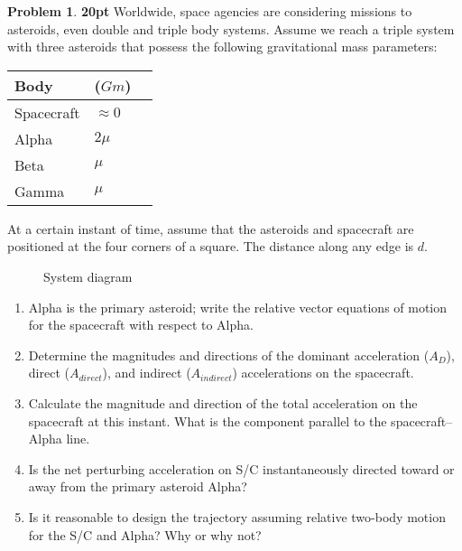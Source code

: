 \documentclass[10pt]{article}
\theoremstyle{definition}
\newtheorem{prob}{Problem}[section]
\newenvironment{subprob}%
{\renewcommand{\theenumi}{\alph{enumi}}\renewcommand{\labelenumi}{(\theenumi)}\begin{enumerate}}%
{\end{enumerate}}%
\begin{document}
\clearpage\newpage
\begin{prob}
    \textbf{20pt} Worldwide, space agencies are considering missions to asteroids, even double and triple body systems. 
    Assume we reach a triple system with three asteroids that possess the following gravitational mass parameters:

    \begin{center}
        \begin{tabular}{llr}  
            \toprule
            Body & (\( Gm\)) \\
            \midrule
            Spacecraft & \( \approx 0 \) \\
            Alpha & \( 2 \mu \) \\
            Beta & \( \mu \) \\
            Gamma & \( \mu \) \\
            \bottomrule
        \end{tabular}
    \end{center}

At a certain instant of time, assume that the asteroids and spacecraft are positioned at the four corners of a square. 
The distance along any edge is \( d\).
\begin{figure}[htbp]
    \centering
{}
\caption{System diagram}
\end{figure}

\begin{subprob}
    \item Alpha is the primary asteroid; write the relative vector equations of motion for the spacecraft with respect to Alpha.
    \item Determine the magnitudes and directions of the dominant acceleration (\(A_D\)), direct (\(A_{direct}\)), and indirect (\(A_{indirect}\)) accelerations on the spacecraft.
    \item Calculate the magnitude and direction of the total acceleration on the spacecraft at this instant. 
        What is the component parallel to the spacecraft--Alpha line.
    \item Is the net perturbing acceleration on S/C instantaneously directed toward or away from the primary asteroid Alpha?

    \item Is it reasonable to design the trajectory assuming relative two-body motion for the S/C and Alpha?
        Why or why not?
\end{subprob}
\end{prob}
\end{document}
